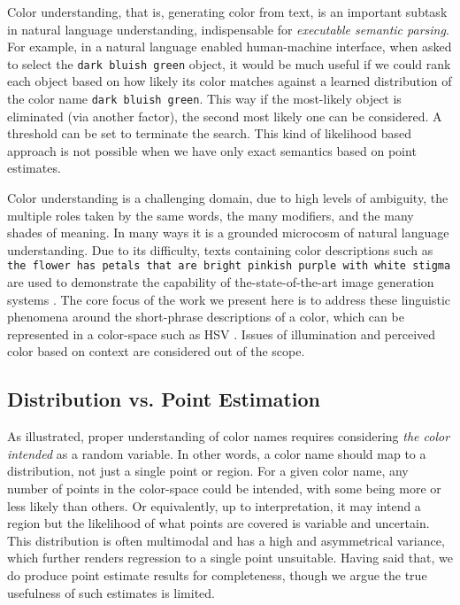 \documentclass[]{clv3}
\newcommand{\parencite}{\citep}
\begin{document}
Color understanding, that is, generating color from text, is an important subtask in natural language understanding, indispensable for {\it executable semantic parsing}. 
For example, in a natural language enabled human-machine interface, when asked to select the \texttt{dark bluish green} object, it would be much useful if we could rank each object based on how likely its color matches against a learned distribution of the color name \texttt{dark bluish green}. 
This way if the most-likely object is eliminated (via another factor), the second most likely one can be considered.
A threshold can be set to terminate the search.
This kind of likelihood based approach is not possible when we have only exact semantics based on point estimates. 


Color understanding is a challenging domain, due to high levels of ambiguity, the multiple roles taken by the same words, the many modifiers, and the many shades of meaning.
In many ways it is a grounded microcosm of natural language understanding.
Due to its difficulty, texts containing color descriptions such as \texttt{the flower has petals that are bright pinkish purple with white stigma} are used to demonstrate the  capability of the-state-of-the-art image generation systems \parencite{reed2016generative, 2015arXiv151102793M}.
The core focus of the work we present here is to address these linguistic phenomena around the short-phrase descriptions of a color, which can be represented in a color-space such as HSV \parencite{smith1978color}.
Issues of illumination and perceived color based on context are considered out of the scope.

\subsection{Distribution vs. Point Estimation}
As illustrated, proper understanding of color names requires considering \emph{the color intended} as a random variable.
In other words, a color name should map to a distribution, not just a single point or region.
For a given color name, any number of points in the color-space could be intended, with some being more or less likely than others.
Or equivalently, up to interpretation, it may intend a region but the likelihood of what points are covered is variable and uncertain.
This distribution is often multimodal and has a high and asymmetrical variance, which further renders regression to a single point unsuitable.
Having said that, we do produce point estimate results for completeness, though we argue the true usefulness of such estimates is limited.
\end{document}
